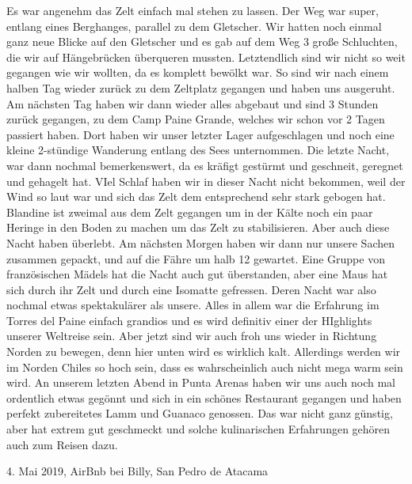 \documentclass[11pt]{book}
\begin{document}
Es war angenehm das Zelt einfach mal stehen zu lassen. Der Weg war super, entlang eines Berghanges, parallel zu dem Gletscher. Wir hatten 
noch einmal ganz neue Blicke auf den Gletscher und es gab auf dem Weg 3 große Schluchten, die wir auf Hängebrücken überqueren mussten. 
Letztendlich sind wir nicht so weit gegangen wie wir wollten, da es komplett bewölkt war. So sind wir nach einem halben Tag wieder 
zurück zu dem Zeltplatz gegangen und haben uns ausgeruht. 
Am nächsten Tag haben wir dann wieder alles abgebaut und sind 3 Stunden zurück gegangen, zu dem Camp Paine Grande, welches wir schon 
vor 2 Tagen passiert haben. Dort haben wir unser letzter Lager aufgeschlagen und noch eine kleine 2-stündige Wanderung entlang des Sees 
unternommen. Die letzte Nacht, war dann nochmal bemerkenswert, da es kräfigt gestürmt und geschneit, geregnet und gehagelt hat. VIel 
Schlaf haben wir in dieser Nacht nicht bekommen, weil der Wind so laut war und sich das Zelt dem entsprechend sehr stark gebogen hat. 
Blandine ist zweimal aus dem Zelt gegangen um in der Kälte noch ein paar Heringe in den Boden zu machen um das Zelt zu stabilisieren. 
Aber auch diese Nacht haben überlebt. Am nächsten Morgen haben wir dann nur unsere Sachen zusammen gepackt, und auf die Fähre um halb 
12 gewartet. Eine Gruppe von französischen Mädels hat die Nacht auch gut überstanden, aber eine Maus hat sich durch ihr Zelt und durch 
eine Isomatte gefressen. Deren Nacht war also nochmal etwas spektakulärer als unsere. 
Alles in allem war die Erfahrung im Torres del Paine einfach grandios und es wird definitiv einer der HIghlights unserer Weltreise sein. 
Aber jetzt sind wir auch froh uns wieder in Richtung Norden zu bewegen, denn hier unten wird es wirklich kalt. Allerdings werden 
wir im Norden Chiles so hoch sein, dass es wahrscheinlich auch nicht mega warm sein wird. 
An unserem letzten Abend in Punta Arenas haben wir uns auch noch mal ordentlich etwas gegönnt und sich in ein schönes Restaurant gegangen 
und haben perfekt zubereitetes Lamm und Guanaco genossen. Das war nicht ganz günstig, aber hat extrem gut geschmeckt und solche 
kulinarischen Erfahrungen gehören auch zum Reisen dazu. 


4. Mai 2019, AirBnb bei Billy, San Pedro de Atacama
\end{document}
